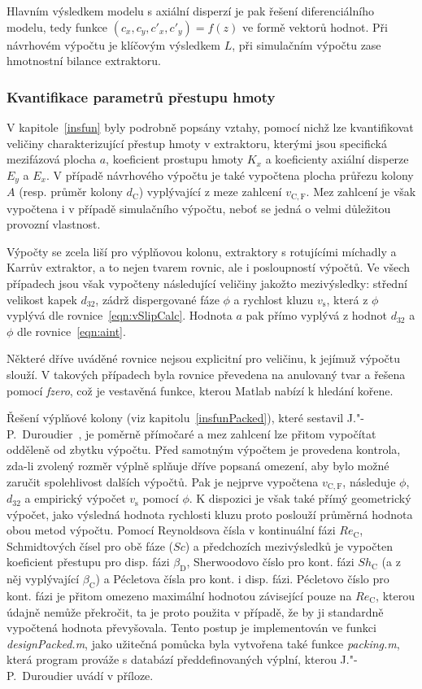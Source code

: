 Hlavním výsledkem modelu s axiální disperzí je pak řešení diferenciálního modelu, tedy funkce $(c_x, c_y, c'_x, c'_y) = f(z)$ ve formě vektorů hodnot.
Při návrhovém výpočtu je klíčovým výsledkem $L$, při simulačním výpočtu zase hmotnostní bilance extraktoru.

\subsubsection{Kvantifikace parametrů přestupu hmoty} \label{compInsfun}
V kapitole~\ref{insfun} byly podrobně popsány vztahy, pomocí nichž lze kvantifikovat veličiny charakterizující přestup hmoty v extraktoru, kterými jsou specifická mezifázová plocha $a$, koeficient prostupu hmoty $K_x$ a koeficienty axiální disperze $E_y$ a $E_x$.
V případě návrhového výpočtu je také vypočtena plocha průřezu kolony $A$ (resp. průměr kolony $d_\mathrm{C}$) vyplývající z meze zahlcení $v_\mathrm{C,F}$.
Mez zahlcení je však vypočtena i v případě simulačního výpočtu, neboť se jedná o velmi důležitou provozní vlastnost.

Výpočty se zcela liší pro výplňovou kolonu, extraktory s rotujícími míchadly a Karrův extraktor, a to nejen tvarem rovnic, ale i posloupností výpočtů.
Ve všech případech jsou však vypočteny následující veličiny jakožto mezivýsledky: střední velikost kapek $d_{32}$, zádrž dispergované fáze $\phi$ a rychlost kluzu $v_\mathrm{s}$, která z $\phi$ vyplývá dle rovnice~\ref{eqn:vSlipCalc}.
Hodnota $a$ pak přímo vyplývá z hodnot $d_{32}$ a $\phi$ dle rovnice~\ref{eqn:aint}.

Některé dříve uváděné rovnice nejsou explicitní pro veličinu, k jejímuž výpočtu slouží.
V takových případech byla rovnice převedena na anulovaný tvar a řešena pomocí \textit{fzero}, což je vestavěná funkce, kterou Matlab nabízí k hledání kořene.

Řešení výplňové kolony (viz kapitolu~\ref{insfunPacked}), které sestavil J."-P.~Duroudier~\cite{Duroudier2016}, je poměrně přímočaré a mez zahlcení lze přitom vypočítat odděleně od zbytku výpočtu.
Před samotným výpočtem je provedena kontrola, zda-li zvolený rozměr výplně splňuje dříve popsaná omezení, aby bylo možné zaručit spolehlivost dalších výpočtů.
Pak je nejprve vypočtena $v_\mathrm{C,F}$, následuje $\phi$, $d_{32}$ a empirický výpočet $v_\mathrm{s}$ pomocí $\phi$.
K dispozici je však také přímý geometrický výpočet, jako výsledná hodnota rychlosti kluzu proto poslouží průměrná hodnota obou metod výpočtu.
Pomocí Reynoldsova čísla v kontinuální fázi $Re_\mathrm{C}$, Schmidtových čísel pro obě fáze ($Sc$) a předchozích mezivýsledků je vypočten koeficient přestupu pro disp. fázi $\beta_\mathrm{D}$, Sherwoodovo číslo pro kont. fázi $Sh_\mathrm{C}$ (a z něj vyplývající $\beta_\mathrm{C}$) a Pécletova čísla pro kont. i disp. fázi.
Pécletovo číslo pro kont. fázi je přitom omezeno maximální hodnotou závisející pouze na $Re_\mathrm{C}$, kterou údajně nemůže překročit, ta je proto použita v případě, že by ji standardně vypočtená hodnota převyšovala.
Tento postup je implementován ve funkci \textit{designPacked.m}, jako užitečná pomůcka byla vytvořena také funkce \textit{packing.m}, která program prováže s databází předdefinovaných výplní, kterou J."-P.~Duroudier uvádí v příloze.

